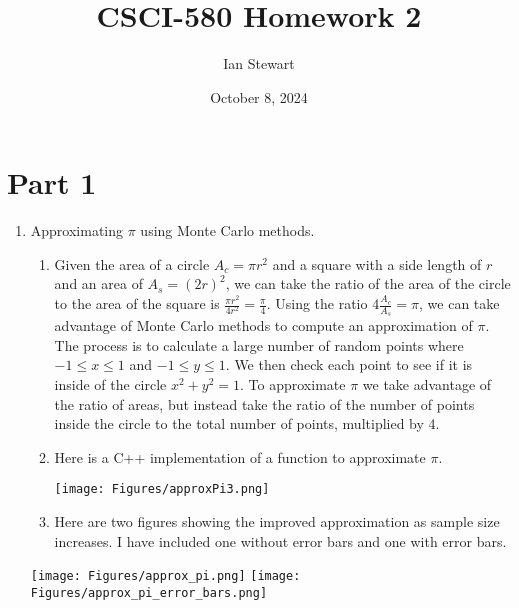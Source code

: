 \documentclass{article}
\title{CSCI-580 Homework 2}
\author{Ian Stewart}
\date{October 8, 2024}
\begin{document}
\maketitle

\section*{Part 1}

\begin{enumerate}
    \item Approximating $\pi$ using Monte Carlo methods.
    \begin{enumerate}
        \item Given the area of a circle $A_c = \pi r^2$ and a square
        with a side length of $r$ and an area of $A_s = (2r)^2$, we can
        take the ratio of the area of the circle to the area of the square
        is $\frac{\pi r^2}{4r^2} = \frac{\pi}{4}$. Using the ratio
        $4\frac{A_c}{A_s} = \pi$, we can take advantage of Monte Carlo
        methods to compute an approximation of $\pi$. The process is to
        calculate a large number of random points where
        $-1 \leq x \leq 1$ and $-1 \leq y \leq 1$. We then check each point
        to see if it is inside of the circle $x^2 + y^2 = 1$. To approximate
        $\pi$ we take advantage of the ratio of areas, but instead take the ratio
        of the number of points inside the circle to the total number of points,
        multiplied by 4.
        \item Here is a C++ implementation of a function to approximate $\pi$.
        \begin{flushleft}
            \texttt{[image: Figures/approxPi3.png]}
        \end{flushleft}
        \newpage
        \item Here are two figures showing the improved approximation as
        sample size increases. I have included one without error bars and
        one with error bars.
    \end{enumerate}
    \begin{center}
        \texttt{[image: Figures/approx\_pi.png]}
        \texttt{[image: Figures/approx\_pi\_error\_bars.png]}
    \end{center}

    \newpage

\end{enumerate}
\end{document}
